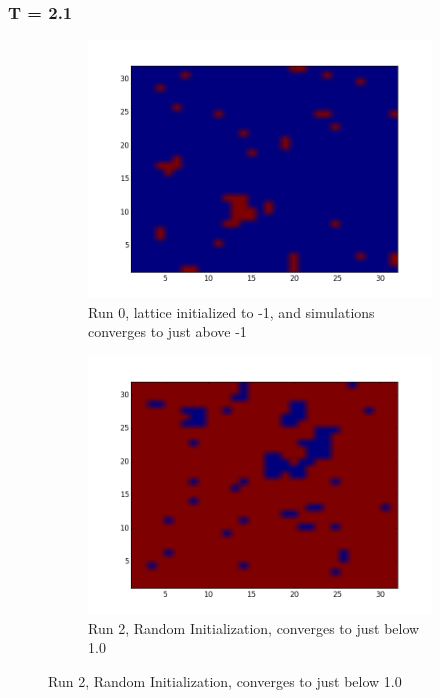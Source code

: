 \documentclass[a4paper,11pt]{article}
\begin{document}
\subsubsection{T = 2.1}
\begin{figure}[!htb]
    \begin{subfigure}[b]{0.5\textwidth}
        \includegraphics[scale=0.40]{2_run_0.png}
        \caption{Run 0, lattice initialized to -1, and simulations converges to just above -1}
	    \label{fig:lat2_0}
    \end{subfigure}
    \begin{subfigure}[b]{0.5\textwidth}
        \includegraphics[scale=0.40]{2_run_2.png}
        \caption{Run 2, Random Initialization, converges to just below 1.0}

\end{subfigure}
\end{figure}
\end{document}

